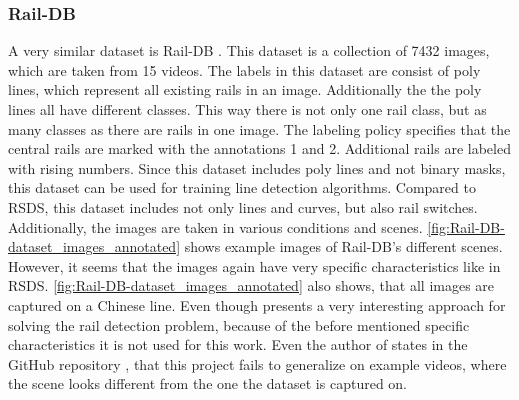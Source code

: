 \subsubsection{Rail-DB}
A very similar dataset is Rail-DB \cite{li2022rail}. This dataset is a collection of 7432 images, which are taken from 15 videos. The labels in this dataset are consist of poly lines, which represent all existing rails in an image. Additionally the the poly lines all have different classes. This way there is not only one rail class, but as many classes as there are rails in one image. The labeling policy specifies that the central rails are marked with the annotations 1 and 2. Additional rails are labeled with rising numbers. Since this dataset includes poly lines and not binary masks, this dataset can be used for training line detection algorithms. Compared to \ac{RSDS}, this dataset includes not only lines and curves, but also rail switches. Additionally, the images are taken in various conditions and scenes. \ref{fig:Rail-DB-dataset_images_annotated} shows example images of Rail-DB's different scenes. However, it seems that the images again have very specific characteristics like in \ac{RSDS}. \ref{fig:Rail-DB-dataset_images_annotated} also shows, that all images are captured on a Chinese line. Even though \cite{li2022rail} presents a very interesting approach for solving the rail detection problem, because of the before mentioned specific characteristics it is not used for this work. Even the author of \cite{li2022rail} states in the GitHub repository \cite{railNet2022GitHub}, that this project fails to generalize on example videos, where the scene looks different from the one the dataset is captured on.

